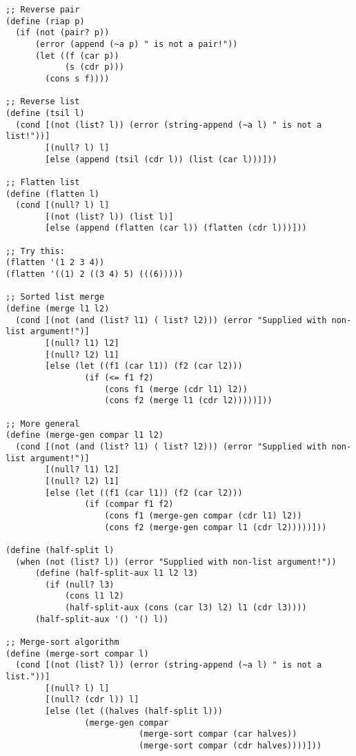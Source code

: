 \begin{lstlisting}
;; Reverse pair
(define (riap p)
  (if (not (pair? p))
      (error (append (~a p) " is not a pair!"))
      (let ((f (car p))
            (s (cdr p)))
        (cons s f))))

;; Reverse list
(define (tsil l)
  (cond [(not (list? l)) (error (string-append (~a l) " is not a list!"))]
        [(null? l) l]
        [else (append (tsil (cdr l)) (list (car l)))]))

;; Flatten list
(define (flatten l)
  (cond [(null? l) l]
        [(not (list? l)) (list l)]
        [else (append (flatten (car l)) (flatten (cdr l)))]))

;; Try this:
(flatten '(1 2 3 4))
(flatten '((1) 2 ((3 4) 5) (((6)))))

;; Sorted list merge
(define (merge l1 l2)
  (cond [(not (and (list? l1) ( list? l2))) (error "Supplied with non-list argument!")]
        [(null? l1) l2]
        [(null? l2) l1]
        [else (let ((f1 (car l1)) (f2 (car l2)))
                (if (<= f1 f2)
                    (cons f1 (merge (cdr l1) l2))
                    (cons f2 (merge l1 (cdr l2)))))]))

;; More general
(define (merge-gen compar l1 l2)
  (cond [(not (and (list? l1) ( list? l2))) (error "Supplied with non-list argument!")]
        [(null? l1) l2]
        [(null? l2) l1]
        [else (let ((f1 (car l1)) (f2 (car l2)))
                (if (compar f1 f2)
                    (cons f1 (merge-gen compar (cdr l1) l2))
                    (cons f2 (merge-gen compar l1 (cdr l2)))))]))

(define (half-split l)
  (when (not (list? l)) (error "Supplied with non-list argument!"))
      (define (half-split-aux l1 l2 l3)
        (if (null? l3)
            (cons l1 l2)
            (half-split-aux (cons (car l3) l2) l1 (cdr l3))))
      (half-split-aux '() '() l))

;; Merge-sort algorithm
(define (merge-sort compar l)
  (cond [(not (list? l)) (error (string-append (~a l) " is not a list."))]
        [(null? l) l]
        [(null? (cdr l)) l]
        [else (let ((halves (half-split l)))
                (merge-gen compar
                           (merge-sort compar (car halves))
                           (merge-sort compar (cdr halves))))]))

\end{lstlisting}
